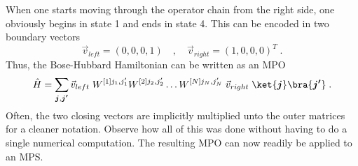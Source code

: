 When one starts moving through the operator chain from the right side, one obviously begins in state 1 and ends in state 4. This can be encoded in two boundary vectors
\begin{equation*}
 \vec{v}_{left} = (0 , 0 , 0  , 1) \quad , \quad \vec{v}_{right} = (1  , 0 ,0 , 0)^T \; .
\end{equation*}
Thus, the Bose-Hubbard Hamiltonian can be written as an MPO 
\begin{equation}
	\hat{H} = \sum_{\boldsymbol{j}, \boldsymbol{j'}} \vec{v}_{left} \; W^{[1] j_1 , j_1 '} W^{[2] j_2 , j_2 '} \ldots W^{[N] j_N , j_N '} \; \vec{v}_{right} \; \ket{\boldsymbol{j}} \bra{\boldsymbol{j'}} \; .
	\label{eq:MPOhamiltonian}
\end{equation}
Often, the two closing vectors are implicitly multiplied unto the outer matrices for a cleaner notation. Observe how all of this was done without having to do a single numerical computation. The resulting MPO can now readily be applied to an MPS.